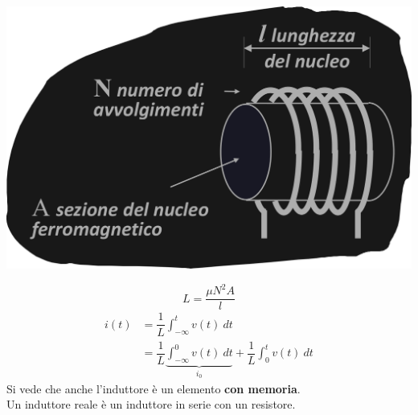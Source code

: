 \documentclass{article}
\begin{document}
\begin{center}
    \includegraphics[scale=0.21]{Image/Induttore ferr.png}
\end{center}
\[
   L = \dfrac{\mu  N^2  A}{l} 
\]
\begin{align*}
    i(t) &= \dfrac{1}{L} \int_{- \infty}^{t} v(t) \ dt \\
    &= \dfrac{1}{L} \underbrace{\int_{- \infty}^{0} v(t) \ dt}_{i_0} + \dfrac{1}{L} \int_{0}^{t} v(t) \ dt
\end{align*}
Si vede che anche l'induttore è un elemento \textbf{con memoria}.\\
Un induttore reale è un induttore in serie con un resistore.
\end{document}
